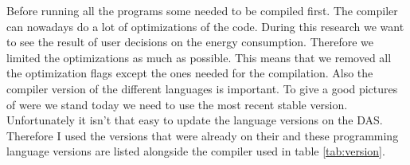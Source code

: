 
Before running all the programs some needed to be compiled first. The compiler can nowadays do a lot of optimizations of the code. During this research we want to see the result of user decisions on the energy consumption. Therefore we limited the optimizations as much as possible. This means that we removed all the optimization flags except the ones needed for the compilation. Also the compiler version of the different languages is important. To give a good pictures of were we stand today we need to use the most recent stable version. Unfortunately it isn't that easy to update the language versions on the DAS. Therefore I used the versions that were already on their and these programming language versions are listed alongside the compiler used in table \ref{tab:version}.

